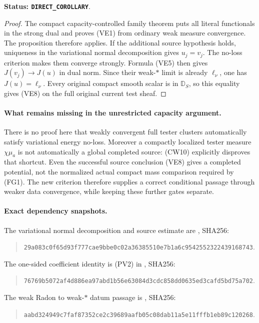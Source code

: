 \documentclass[11pt,a4paper]{article}
\numberwithin{equation}{section}
\theoremstyle{definition}
\theoremstyle{remark}
\begin{document}
\noindent\textbf{Status: \texttt{DIRECT\_COROLLARY}}.

\begin{proof}
The compact capacity-controlled family theorem puts
all literal functionals in the strong dual and
proves (VE1) from ordinary weak measure convergence.
The proposition therefore applies. If the additional
source hypothesis holds, uniqueness in the variational
normal decomposition gives $u_j=v_j$. The no-loss
criterion makes them converge strongly. Formula
(VE5) then gives $J(v_j)\to J(u)$ in dual norm.
Since their weak-$*$ limit is already $\ell_\nu$,
one has $J(u)=\ell_\nu$. Every original compact
smooth scalar is in $\mathbb D_S$, so this equality
gives (VE8) on the full original current test sheaf.
\end{proof}

\paragraph{What remains missing in the unrestricted capacity argument.}
There is no proof here that weakly convergent full
tester clusters automatically satisfy variational
energy no-loss. Moreover a compactly localized tester
measure $\chi\mu_a$ is not automatically a global
completed source: (CW10) explicitly disproves that
shortcut. Even the successful source conclusion
(VE8) gives a completed potential, not the normalized
actual compact mass comparison required by (FG1).
The new criterion therefore supplies a correct
conditional passage through weaker data convergence,
while keeping these further gates separate.

\paragraph{Exact dependency snapshots.}
The variational normal decomposition and source estimate are
, SHA256:
\begin{quote}\small
\nolinkurl{29a083c0f65d93f777cae9bbe0c02a36385510e7b1a6c9542552322439168743}.
\end{quote}
The one-sided coefficient identity is (PV2) in
, SHA256:
\begin{quote}\small
\nolinkurl{76769b5072af4d886ea97abd1b56e63084d3cdc858dd0635ed3cafd5bd75a702}.
\end{quote}
The weak Radon to weak-$*$ datum passage is
, SHA256:
\begin{quote}\small
\nolinkurl{aabd324949c7faf87352ce2c39689aafb05c08dab11a5e11fffb1eb89c120268}.
\end{quote}
\end{document}
